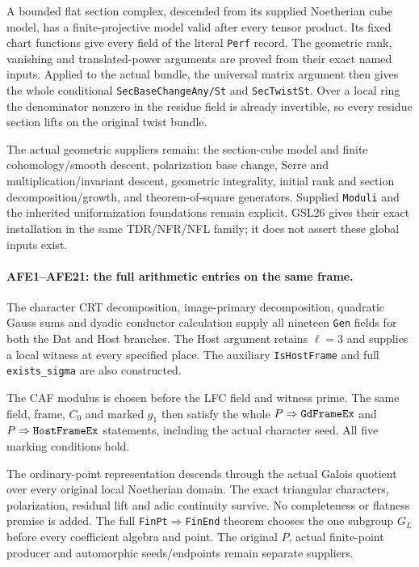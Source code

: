 \documentclass[11pt,a4paper]{article}
\numberwithin{equation}{section}
\theoremstyle{remark}\newtheorem{remark}[theorem]{Remark}
\begin{document}
A bounded flat section complex, descended from its supplied
Noetherian cube model, has a finite-projective model valid after
every tensor product. Its fixed chart functions give every field of
the literal \texttt{Perf} record. The geometric rank, vanishing
and translated-power arguments are proved from their exact named
inputs. Applied to the actual bundle, the universal matrix argument
then gives the whole conditional \texttt{Sec\allowbreak Base\allowbreak Change\allowbreak Any/\allowbreak St} and
\texttt{Sec\allowbreak Twist\allowbreak St}. Over a local ring the denominator nonzero in
the residue field is already invertible, so every residue section
lifts on the original twist bundle.

The actual geometric suppliers remain: the section-cube model and
finite cohomology/smooth descent, polarization base change, Serre
and multiplication/invariant descent, geometric integrality, initial rank and section
decomposition/growth, and theorem-of-square generators. Supplied
\texttt{Moduli} and the inherited uniformization foundations remain
explicit. GSL26 gives their exact installation in the same
TDR/NFR/NFL family; it does not assert these global inputs exist.

\paragraph{AFE1--AFE21: the full arithmetic entries on the same frame.}
The character CRT decomposition, image-primary decomposition,
quadratic Gauss sums and dyadic conductor calculation supply all
nineteen \texttt{Gen} fields for both the Dat and Host branches.
The Host argument retains $\ell=3$ and supplies a local witness
at every specified place. The auxiliary \texttt{Is\allowbreak Host\allowbreak Frame}
and full \texttt{exists\_\allowbreak sigma} are also constructed.

The CAF modulus is chosen before the LFC field and witness prime.
The same field, frame, $C_0$ and marked $g_1$ then satisfy the
whole $P\Rightarrow\texttt{Gd\allowbreak Frame\allowbreak Ex}$ and
$P\Rightarrow\texttt{Host\allowbreak Frame\allowbreak Ex}$ statements, including the
actual character seed. All five marking conditions hold.

The ordinary-point representation descends through the actual
Galois quotient over every original local Noetherian domain.
The exact triangular characters, polarization, residual lift and
adic continuity survive. No completeness or flatness premise is
added. The full \texttt{Fin\allowbreak Pt}\!$\Rightarrow$\!\texttt{Fin\allowbreak End}
theorem chooses the one subgroup $G_L$ before every coefficient
algebra and point. The original $P$, actual finite-point producer
and automorphic seeds/endpoints remain separate suppliers.
\end{document}
